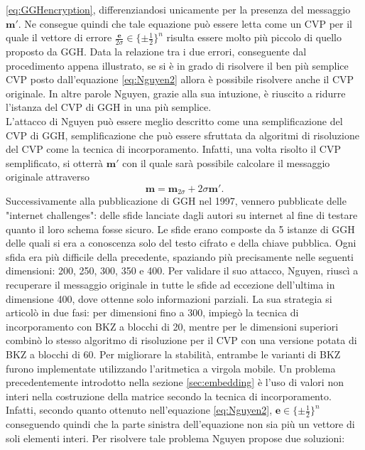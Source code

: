 \ref{eq:GGHencryption}, differenziandosi unicamente per la presenza del messaggio $\mathbf{m}'$.
Ne consegue quindi che tale equazione può essere letta come un CVP per il quale il vettore di 
errore $\frac{\mathbf{e}}{2\sigma} \in \{\pm\frac{1}{2}\}^n$ risulta essere molto più piccolo
di quello proposto da GGH. Data la relazione tra i due errori, conseguente dal procedimento appena
illustrato, se si è in grado di risolvere il ben più semplice CVP posto dall'equazione 
\ref{eq:Nguyen2} allora è possibile risolvere anche il CVP originale. In altre parole 
Nguyen, grazie alla sua intuzione, è riuscito a ridurre l'istanza del CVP di GGH in una più
semplice. \\
L'attacco di Nguyen può essere meglio descritto come una semplificazione del CVP di GGH, 
semplificazione che può essere sfruttata da algoritmi di risoluzione del CVP come la 
tecnica di incorporamento. Infatti, una volta risolto il CVP semplificato, si otterrà 
$\mathbf{m}'$ con il quale sarà possibile calcolare il messaggio originale attraverso 
\[
    \mathbf{m} = \mathbf{m}_{2\sigma} + 2\sigma\mathbf{m}'.
\] 
Successivamente alla pubblicazione di GGH nel 1997, vennero
pubblicate delle "internet challenges": delle sfide lanciate dagli autori su internet
al fine di testare quanto il loro schema fosse sicuro. Le sfide erano composte da 5 istanze di GGH
delle quali si era a conoscenza solo del testo cifrato e della chiave pubblica. Ogni sfida 
era più difficile della precedente, spaziando più precisamente nelle seguenti dimensioni: 
200, 250, 300, 350 e 400. Per validare il suo attacco, Nguyen, riuscì a recuperare il messaggio 
originale in tutte le sfide ad eccezione dell'ultima in dimensione 400, dove ottenne solo informazioni 
parziali. La sua strategia si articolò in due fasi: per dimensioni fino a 300, impiegò la 
tecnica di incorporamento con BKZ a blocchi di 20, mentre per le dimensioni superiori combinò lo stesso 
algoritmo di risoluzione per il CVP con una versione potata di BKZ a blocchi di 60. Per migliorare la 
stabilità, entrambe le varianti di BKZ furono implementate utilizzando l'aritmetica a 
virgola mobile. Un problema precedentemente introdotto nella sezione \ref{sec:embedding} 
è l'uso di valori non interi nella costruzione della matrice secondo la tecnica di incorporamento. 
Infatti, secondo quanto ottenuto nell'equazione \ref{eq:Nguyen2}, 
$\mathbf{e} \in \{\pm\frac{1}{2}\}^n$ conseguendo quindi che la parte sinistra dell'equazione
non sia più un vettore di soli elementi interi. Per risolvere tale problema Nguyen propose
due soluzioni:
